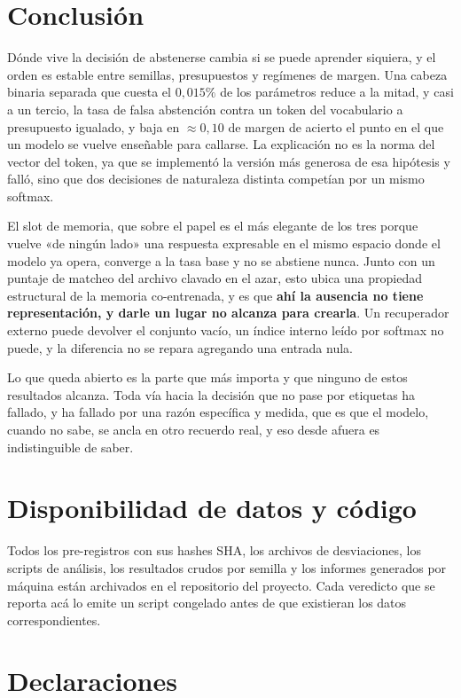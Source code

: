\documentclass[11pt,a4paper]{article}
\begin{document}
\section{Conclusión}

Dónde vive la decisión de abstenerse cambia si se puede aprender siquiera, y el orden es estable
entre semillas, presupuestos y regímenes de margen. Una cabeza binaria separada que cuesta el
$0{,}015\%$ de los parámetros reduce a la mitad, y casi a un tercio, la tasa de falsa abstención
contra un token del vocabulario a presupuesto igualado, y baja en $\approx 0{,}10$ de margen de
acierto el punto en el que un modelo se vuelve enseñable para callarse. La explicación no es la norma
del vector del token, ya que se implementó la versión más generosa de esa hipótesis y falló, sino que
dos decisiones de naturaleza distinta competían por un mismo softmax.

El slot de memoria, que sobre el papel es el más elegante de los tres porque vuelve «de ningún lado»
una respuesta expresable en el mismo espacio donde el modelo ya opera, converge a la tasa base y no
se abstiene nunca. Junto con un puntaje de matcheo del archivo clavado en el azar, esto ubica una
propiedad estructural de la memoria co-entrenada, y es que \textbf{ahí la ausencia no tiene
representación, y darle un lugar no alcanza para crearla}. Un recuperador externo puede devolver el
conjunto vacío, un índice interno leído por softmax no puede, y la diferencia no se repara agregando
una entrada nula.

Lo que queda abierto es la parte que más importa y que ninguno de estos resultados alcanza. Toda vía
hacia la decisión que no pase por etiquetas ha fallado, y ha fallado por una razón específica y
medida, que es que el modelo, cuando no sabe, se ancla en otro recuerdo real, y eso desde afuera es
indistinguible de saber.

\section*{Disponibilidad de datos y código}

Todos los pre-registros con sus hashes SHA, los archivos de desviaciones, los scripts de análisis,
los resultados crudos por semilla y los informes generados por máquina están archivados en el
repositorio del proyecto. Cada veredicto que se reporta acá lo emite un script congelado antes de que
existieran los datos correspondientes.

\section*{Declaraciones}
\end{document}
